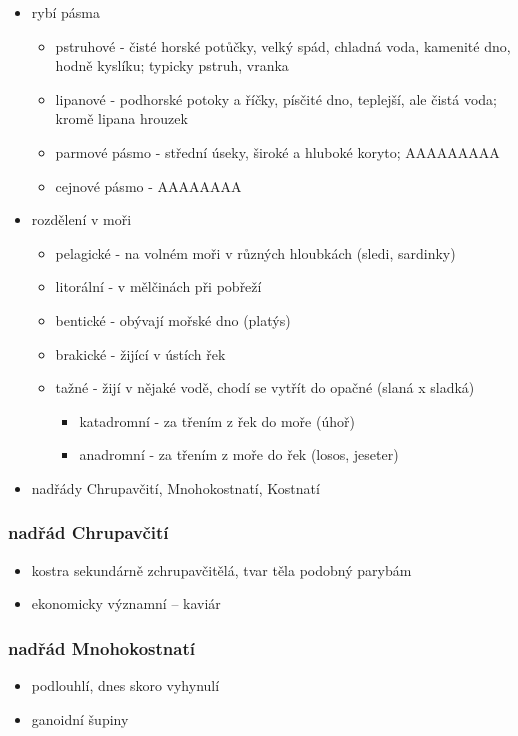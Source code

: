 \documentclass{article}
\begin{document}
\begin{itemize}
  \item rybí pásma
  \begin{itemize}
    \item pstruhové - čisté horské potůčky, velký spád, chladná voda, kamenité dno, hodně kyslíku; typicky pstruh, vranka
    \item lipanové - podhorské potoky a říčky, písčité dno, teplejší, ale čistá voda; kromě lipana hrouzek
    \item parmové pásmo - střední úseky, široké a hluboké koryto; AAAAAAAAA
    \item cejnové pásmo - AAAAAAAA
  \end{itemize}
  \item rozdělení v moři
  \begin{itemize}
    \item pelagické - na volném moři v různých hloubkách (sledi, sardinky)
    \item litorální - v mělčinách při pobřeží
    \item bentické - obývají mořské dno (platýs)
    \item brakické - žijící v ústích řek
    \item tažné - žijí v nějaké vodě, chodí se vytřít do opačné (slaná x sladká)
    \begin{itemize}
      \item katadromní - za třením z řek do moře (úhoř)
      \item anadromní - za třením z moře do řek (losos, jeseter)
    \end{itemize}
  \end{itemize}
  \item nadřády Chrupavčití, Mnohokostnatí, Kostnatí
\end{itemize}

\subsubsection{nadřád Chrupavčití}
\begin{itemize}
  \item kostra sekundárně zchrupavčitělá, tvar těla podobný parybám
  \item ekonomicky významní -- kaviár
\end{itemize}

\subsubsection{nadřád Mnohokostnatí}
\begin{itemize}
  \item podlouhlí, dnes skoro vyhynulí
  \item ganoidní šupiny
\end{itemize}
\end{document}
